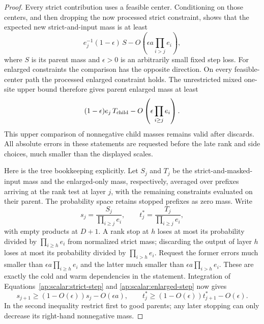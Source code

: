 \begin{proof}
Every strict contribution uses a feasible center. Conditioning on
those centers, and then dropping the now processed strict constraint,
shows that the expected new strict-and-input mass is at least
\begin{equation}\label{ap:scalar:strict-step}
       e_j^{-1}(1-\epsilon)\,S
                          -O\left(\epsilon a\prod_{i>j}e_i\right),
\end{equation}
where $S$ is its parent mass and $\epsilon>0$ is an arbitrarily small
fixed step loss. For enlarged constraints the comparison has the
opposite direction. On every feasible-center path the processed
enlarged constraint holds. The unrestricted mixed one-site upper
bound therefore gives parent enlarged mass at least
\begin{equation}\label{ap:scalar:enlarged-step}
          (1-\epsilon)e_j\,T_{\rm child}
                            -O\left(\epsilon\prod_{i\ge j}e_i\right).
\end{equation}
This upper comparison of nonnegative child masses remains valid
after discards. All absolute errors in these statements are requested
before the late rank and side choices, much smaller than the displayed
scales.

Here is the tree bookkeeping explicitly. Let $S_j$ and $T_j$ be the
strict-and-masked-input mass and the enlarged-only mass, respectively,
averaged over prefixes arriving at the rank test at layer $j$, with
the remaining constraints evaluated on their parent. The probability
space retains stopped prefixes as zero mass. Write
\[
      s_j=\frac{S_j}{\prod_{i\ge j}e_i},\qquad
      t_j^*=\frac{T_j}{\prod_{i\ge j}e_i},
\]
with empty products at $D+1$. A rank stop at $h$ loses at most its
probability divided by $\prod_{i\ge h}e_i$ from normalized strict
mass; discarding the output of layer $h$ loses at most its probability
divided by $\prod_{i>h}e_i$. Request the former errors much smaller
than $\epsilon a\prod_{i\ge h}e_i$ and the latter much smaller than
$\epsilon a\prod_{i>h}e_i$. These are exactly the cold and warm
dependencies in the statement. Integration of
Equations~\eqref{ap:scalar:strict-step} and
\eqref{ap:scalar:enlarged-step} now gives
\begin{equation}\label{ap:scalar:mass-recurrences}
 s_{j+1}\ge(1-O(\epsilon))s_j-O(\epsilon a),\qquad
 t_j^*\ge(1-O(\epsilon))t_{j+1}^*-O(\epsilon).
\end{equation}
In the second inequality restrict first to good parents; any later
stopping can only decrease its right-hand nonnegative mass.


\end{proof}
